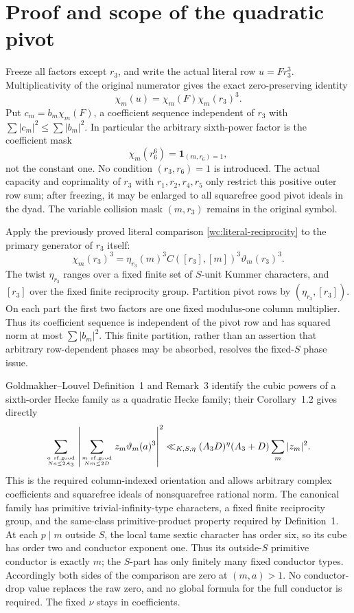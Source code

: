 \section{Proof and scope of the quadratic pivot}\label{qp:details}
Freeze all factors except $r_3$, and write the actual literal row
$u=Fr_3^3$. Multiplicativity of the original numerator gives the exact
zero-preserving identity
\[
 \chi_m(u)=\chi_m(F)\chi_m(r_3)^3.
\]
Put $c_m=b_m\chi_m(F)$, a coefficient sequence independent of $r_3$ with
$\sum|c_m|^2\le\sum|b_m|^2$. In particular the arbitrary sixth-power
factor is the coefficient mask
\[
 \chi_m(r_6^6)=\mathbf1_{(m,r_6)=1},
\]
not the constant one. No condition $(r_3,r_6)=1$ is introduced.
The actual capacity and coprimality of $r_3$ with
$r_1,r_2,r_4,r_5$ only restrict this positive outer row sum; after freezing,
it may be enlarged to all squarefree good pivot ideals in the dyad.
The variable collision mask $(m,r_3)$ remains in the original symbol.

Apply the previously proved literal comparison
\eqref{wc:literal-reciprocity} to the primary generator of $r_3$ itself:
\[
 \chi_m(r_3)^3=
 \eta_{r_3}(m)^3 C([r_3],[m])^3\vartheta_m(r_3)^3.
\]
The twist $\eta_{r_3}$ ranges over a fixed finite set of $S$-unit Kummer
characters, and $[r_3]$ over the fixed finite reciprocity group.
Partition pivot rows by $(\eta_{r_3},[r_3])$. On each part the first two
factors are one fixed modulus-one column multiplier. Thus its coefficient
sequence is independent of the pivot row and has squared norm at most
$\sum|b_m|^2$. This finite partition, rather than an assertion that arbitrary
row-dependent phases may be absorbed, resolves the fixed-$S$ phase issue.

Goldmakher--Louvel Definition~1 and Remark~3 identify the cubic powers
of a sixth-order Hecke family as a quadratic Hecke family; their
Corollary~1.2 gives directly
\[
 \sum_{a\ \mathrm{sf,good}\atop Na\le2A_3}
 \left|\sum_{m\ \mathrm{sf,good}\atop Nm\le2D}
                z_m\vartheta_m(a)^3\right|^2
 \ll_{K,S,\eta}(A_3D)^\eta(A_3+D)\sum_m|z_m|^2.
\]
This is the required column-indexed orientation and allows arbitrary
complex coefficients and squarefree ideals of nonsquarefree rational norm.
The canonical family has primitive trivial-infinity-type characters, a
fixed finite reciprocity group, and the same-class primitive-product
property required by Definition~1. At each $p\mid m$ outside $S$, the
local tame sextic character has order six, so its cube has order two and
conductor exponent one. Thus its outside-$S$ primitive conductor is
exactly $m$; the $S$-part has only finitely many fixed conductor types.
Accordingly both sides of the comparison are zero at $(m,a)>1$.
No conductor-drop value replaces the raw zero, and no global formula
for the full conductor is required. The fixed $\nu$ stays in coefficients.

